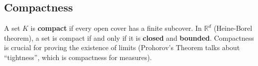 \subsection{Compactness}
A set $K$ is \textbf{compact} if every open cover has a finite subcover.
In $\mathbb{R}^d$ (Heine-Borel theorem), a set is compact if and only if it is \textbf{closed} and \textbf{bounded}.
Compactness is crucial for proving the existence of limits (Prohorov's Theorem talks about ``tightness'', which is compactness for measures).
